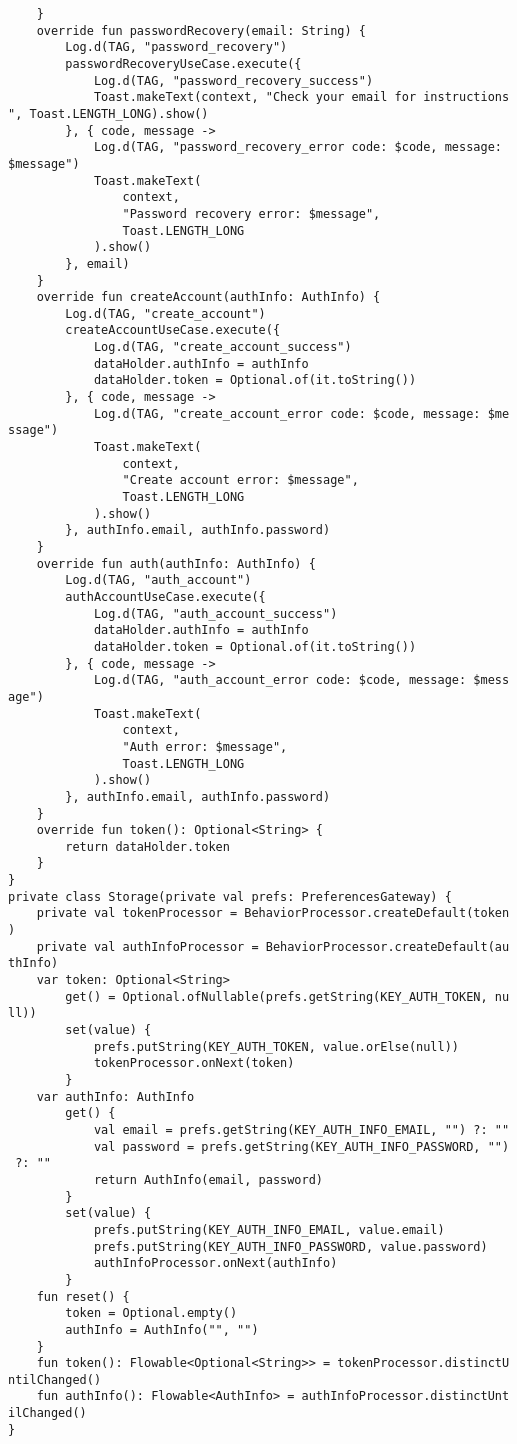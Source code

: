 \documentclass[listing]{espd}
\begin{document}
\begin{verbatim}
    }
    override fun passwordRecovery(email: String) {
        Log.d(TAG, "password_recovery")
        passwordRecoveryUseCase.execute({
            Log.d(TAG, "password_recovery_success")
            Toast.makeText(context, "Check your email for instructions
", Toast.LENGTH_LONG).show()
        }, { code, message ->
            Log.d(TAG, "password_recovery_error code: $code, message: 
$message")
            Toast.makeText(
                context,
                "Password recovery error: $message",
                Toast.LENGTH_LONG
            ).show()
        }, email)
    }
    override fun createAccount(authInfo: AuthInfo) {
        Log.d(TAG, "create_account")
        createAccountUseCase.execute({
            Log.d(TAG, "create_account_success")
            dataHolder.authInfo = authInfo
            dataHolder.token = Optional.of(it.toString())
        }, { code, message ->
            Log.d(TAG, "create_account_error code: $code, message: $me
ssage")
            Toast.makeText(
                context,
                "Create account error: $message",
                Toast.LENGTH_LONG
            ).show()
        }, authInfo.email, authInfo.password)
    }
    override fun auth(authInfo: AuthInfo) {
        Log.d(TAG, "auth_account")
        authAccountUseCase.execute({
            Log.d(TAG, "auth_account_success")
            dataHolder.authInfo = authInfo
            dataHolder.token = Optional.of(it.toString())
        }, { code, message ->
            Log.d(TAG, "auth_account_error code: $code, message: $mess
age")
            Toast.makeText(
                context,
                "Auth error: $message",
                Toast.LENGTH_LONG
            ).show()
        }, authInfo.email, authInfo.password)
    }
    override fun token(): Optional<String> {
        return dataHolder.token
    }
}
private class Storage(private val prefs: PreferencesGateway) {
    private val tokenProcessor = BehaviorProcessor.createDefault(token
)
    private val authInfoProcessor = BehaviorProcessor.createDefault(au
thInfo)
    var token: Optional<String>
        get() = Optional.ofNullable(prefs.getString(KEY_AUTH_TOKEN, nu
ll))
        set(value) {
            prefs.putString(KEY_AUTH_TOKEN, value.orElse(null))
            tokenProcessor.onNext(token)
        }
    var authInfo: AuthInfo
        get() {
            val email = prefs.getString(KEY_AUTH_INFO_EMAIL, "") ?: ""
            val password = prefs.getString(KEY_AUTH_INFO_PASSWORD, "")
 ?: ""
            return AuthInfo(email, password)
        }
        set(value) {
            prefs.putString(KEY_AUTH_INFO_EMAIL, value.email)
            prefs.putString(KEY_AUTH_INFO_PASSWORD, value.password)
            authInfoProcessor.onNext(authInfo)
        }
    fun reset() {
        token = Optional.empty()
        authInfo = AuthInfo("", "")
    }
    fun token(): Flowable<Optional<String>> = tokenProcessor.distinctU
ntilChanged()
    fun authInfo(): Flowable<AuthInfo> = authInfoProcessor.distinctUnt
ilChanged()
}
\end{verbatim}
\end{document}
